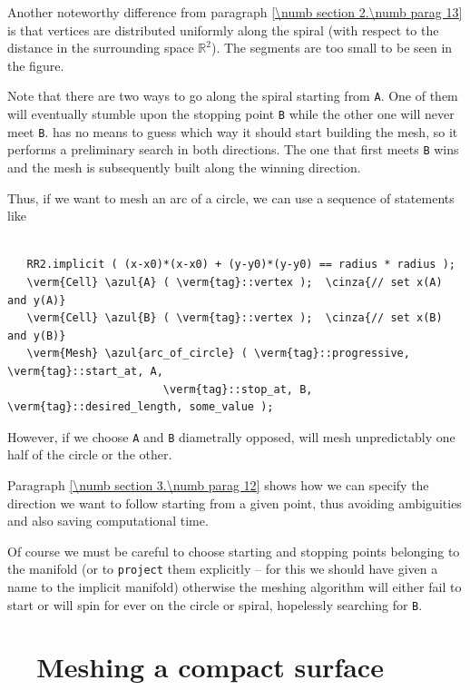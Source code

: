 Another noteworthy difference from paragraph \ref{\numb section 2.\numb parag 13} is that
vertices are distributed uniformly along the spiral (with respect to the distance
in the surrounding space $ \mathbb{R}^2 $).
The segments are too small to be seen in the figure.

Note that there are two ways to go along the spiral starting from {\small\tt A}.
One of them will eventually stumble upon the stopping point {\small\tt B} while
the other one will never meet {\small\tt B}.
{\ManiFEM} has no means to guess which way it should start building the mesh,
so it performs a preliminary search in both directions.
The one that first meets {\small\tt B} wins and the mesh is subsequently built along
the winning direction.

Thus, if we want to mesh an arc of a circle, we can use a sequence of statements like

\begin{Verbatim}[commandchars=\\\{\},formatcom=\small\tt,
   baselinestretch=0.94,framesep=2mm                      ]

   RR2.implicit ( (x-x0)*(x-x0) + (y-y0)*(y-y0) == radius * radius );
   \verm{Cell} \azul{A} ( \verm{tag}::vertex );  \cinza{// set x(A) and y(A)}
   \verm{Cell} \azul{B} ( \verm{tag}::vertex );  \cinza{// set x(B) and y(B)}
   \verm{Mesh} \azul{arc_of_circle} ( \verm{tag}::progressive, \verm{tag}::start_at, A,
                        \verm{tag}::stop_at, B, \verm{tag}::desired_length, some_value );
\end{Verbatim}

However, if we choose {\small\tt A} and {\small\tt B} diametrally opposed, {\maniFEM} will
mesh unpredictably one half of the circle or the other.

Paragraph \ref{\numb section 3.\numb parag 12} shows how we can specify the direction we
want to follow starting from a given point, thus avoiding ambiguities and also saving
computational time.

Of course we must be careful to choose starting and stopping points belonging to the manifold
(or to {\small\tt project} them explicitly -- for this we should have given a name to the
implicit manifold) otherwise the meshing algorithm will either fail to start or will spin
for ever on the circle or spiral, hopelessly searching for {\small\tt B}.


\section{~~Meshing a compact surface}\label{\numb section 3.\numb parag 6}

